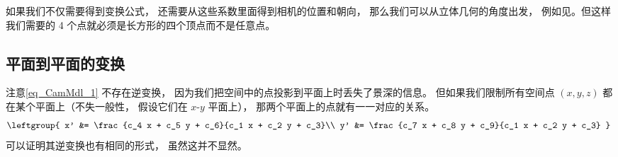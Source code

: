 如果我们不仅需要得到变换公式， 还需要从这些系数里面得到相机的位置和朝向， 那么我们可以从立体几何的角度出发， 例如见。但这样我们需要的 4 个点就必须是长方形的四个顶点而不是任意点。

\subsection{平面到平面的变换}
注意\autoref{eq_CamMdl_1} 不存在逆变换， 因为我们把空间中的点投影到平面上时丢失了景深的信息。 但如果我们限制所有空间点 $(x, y, z)$ 都在某个平面上（不失一般性， 假设它们在 $x$-$y$ 平面上）， 那两个平面上的点就有一一对应的关系。
\begin{equation}
\leftgroup{
x' &= \frac{c_4 x + c_5 y + c_6}{c_1 x + c_2 y + c_3}\\
y' &= \frac{c_7 x + c_8 y + c_9}{c_1 x + c_2 y + c_3}
}~
\end{equation}
可以证明其逆变换也有相同的形式， 虽然这并不显然。
